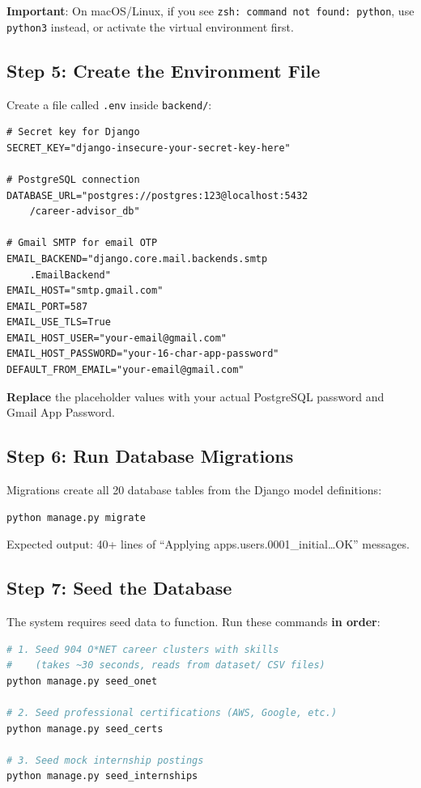 \documentclass[12pt, a4paper]{article}
\begin{document}
\textbf{Important}: On macOS/Linux, if you see \texttt{zsh: command not found: python}, use \texttt{python3} instead, or activate the virtual environment first.

\subsection{Step 5: Create the Environment File}

Create a file called \texttt{.env} inside \texttt{backend/}:

\begin{lstlisting}[caption={backend/.env --- Required Environment Variables}]
# Secret key for Django
SECRET_KEY="django-insecure-your-secret-key-here"

# PostgreSQL connection
DATABASE_URL="postgres://postgres:123@localhost:5432
    /career-advisor_db"

# Gmail SMTP for email OTP
EMAIL_BACKEND="django.core.mail.backends.smtp
    .EmailBackend"
EMAIL_HOST="smtp.gmail.com"
EMAIL_PORT=587
EMAIL_USE_TLS=True
EMAIL_HOST_USER="your-email@gmail.com"
EMAIL_HOST_PASSWORD="your-16-char-app-password"
DEFAULT_FROM_EMAIL="your-email@gmail.com"
\end{lstlisting}

\textbf{Replace} the placeholder values with your actual PostgreSQL password and Gmail App Password.

\subsection{Step 6: Run Database Migrations}

Migrations create all 20 database tables from the Django model definitions:

\begin{lstlisting}[language=bash]
python manage.py migrate
\end{lstlisting}

Expected output: 40+ lines of ``Applying apps.users.0001\_initial\ldots OK'' messages.

\subsection{Step 7: Seed the Database}

The system requires seed data to function. Run these commands \textbf{in order}:

\begin{lstlisting}[language=bash]
# 1. Seed 904 O*NET career clusters with skills
#    (takes ~30 seconds, reads from dataset/ CSV files)
python manage.py seed_onet

# 2. Seed professional certifications (AWS, Google, etc.)
python manage.py seed_certs

# 3. Seed mock internship postings
python manage.py seed_internships
\end{lstlisting}
\end{document}
